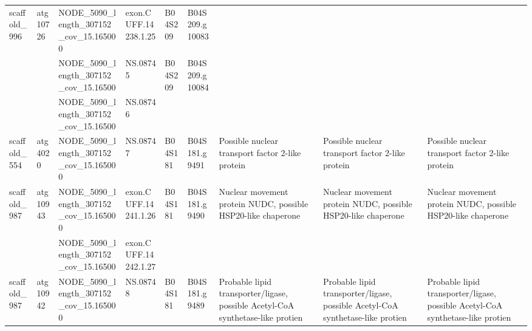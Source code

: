 \begin{longtable}{lllllllll}
   scaffold\_996 &  atg10726 &   NODE\_5090\_length\_307152\_cov\_15.165000 &  exon.CUFF.14238.1.25 &      B04S209 &  B04S209.g10083 &                                                                                 &                                                                                 &                                                                                 \\
                &           &    NODE\_5090\_length\_307152\_cov\_15.16500 &              NS.08745 &      B04S209 &  B04S209.g10084 &                                                                                 &                                                                                 &                                                                                 \\
                &           &    NODE\_5090\_length\_307152\_cov\_15.16500 &              NS.08746 &              &                 &                                                                                 &                                                                                 &                                                                                 \\
   scaffold\_554 &   atg4020 &   NODE\_5090\_length\_307152\_cov\_15.165000 &              NS.08747 &      B04S181 &   B04S181.g9491 &                                Possible nuclear transport factor 2-like protein &                                Possible nuclear transport factor 2-like protein &                                Possible nuclear transport factor 2-like protein \\
   scaffold\_987 &  atg10943 &   NODE\_5090\_length\_307152\_cov\_15.165000 &  exon.CUFF.14241.1.26 &      B04S181 &   B04S181.g9490 &                    Nuclear movement protein NUDC, possible HSP20-like chaperone &                    Nuclear movement protein NUDC, possible HSP20-like chaperone &                    Nuclear movement protein NUDC, possible HSP20-like chaperone \\
                &           &    NODE\_5090\_length\_307152\_cov\_15.16500 &  exon.CUFF.14242.1.27 &              &                 &                                                                                 &                                                                                 &                                                                                 \\
   scaffold\_987 &  atg10942 &   NODE\_5090\_length\_307152\_cov\_15.165000 &              NS.08748 &      B04S181 &   B04S181.g9489 &  Probable lipid transporter/ligase, possible Acetyl-CoA synthetase-like protien &  Probable lipid transporter/ligase, possible Acetyl-CoA synthetase-like protien &  Probable lipid transporter/ligase, possible Acetyl-CoA synthetase-like protien \\

\end{longtable}
